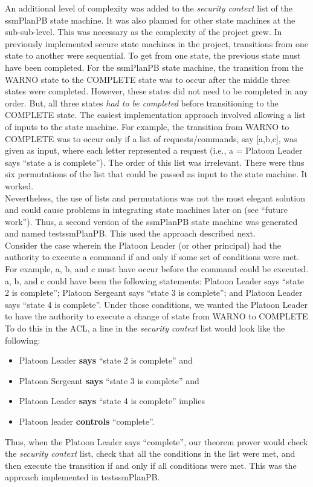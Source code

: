 An additional level of complexity was added to the \textit{security context} list of the ssmPlanPB
state machine. It was also planned for other state machines at the sub-sub-level. This was
necessary as the complexity of the project grew. In previously implemented secure state
machines in the project, transitions from one state to another were sequential. To get from
one state, the previous state must have been completed. For the ssmPlanPB state machine,
the transition from the WARNO state to the COMPLETE state was to occur after the middle three
states were completed. However, these states did not need to be completed in any order.
But, all three states \textit{had to be completed} before transitioning to the COMPLETE state. The
easiest implementation approach involved allowing a list of inputs to the state machine.
For example, the transition from WARNO to COMPLETE was to occur only if a list of requests/commands,
say [a,b,c], was given as input, where each letter represented a request (i.e., a = Platoon
Leader says “state a is complete”). The order of this list was irrelevant. There were thus six
permutations of the list that could be passed as input to the state machine. It worked.\\

Nevertheless, the use of lists and permutations was not the most elegant solution and could
cause problems in integrating state machines later on (see “future work”). Thus, a second version
of the ssmPlanPB state machine was generated and named testssmPlanPB. This used the approach described next.\\

Consider the case wherein the Platoon Leader (or other principal) had the authority to
execute a command if and only if some set of conditions were met. For example, a, b, and
c must have occur before the command could be executed. a, b, and c could have been the
following statements: Platoon Leader says “state 2 is complete”; Platoon Sergeant says
“state 3 is complete”; and Platoon Leader says “state 4 is complete”. Under those conditions,
we wanted the Platoon Leader to have the authority to execute a change of state from WARNO
to COMPLETE To do this in the ACL, a line in the \textit{security context} list would look like the following:
\begin{itemize}
\item Platoon Leader \textbf{says} “state 2 is complete” and
\item Platoon Sergeant \textbf{says} “state 3 is complete” and
\item Platoon Leader \textbf{says} “state 4 is complete” implies
\item Platoon leader \textbf{controls} “complete”.
\end{itemize}
Thus, when the Platoon Leader says “complete”, our theorem prover would check the \textit{security
context} list, check that all the conditions in the list were met, and then execute the transition
if and only if all conditions were met. This was the approach implemented in testssmPlanPB.\\

